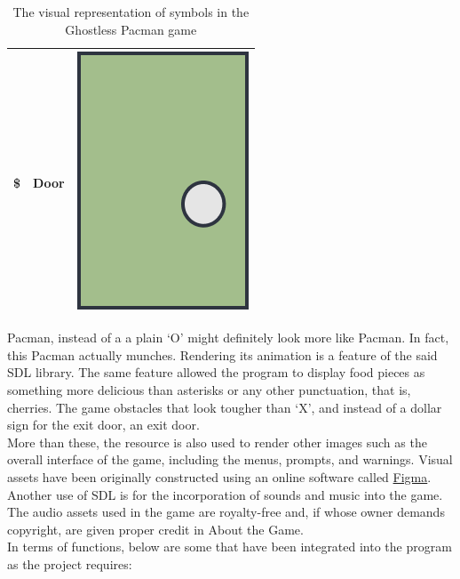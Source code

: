 \begin{table}[H]
\begin{tabular}{ c c c }
        \$ & Door & \includegraphics[scale=0.1]{assets/door_sample.png}\\
        \bottomrule
    \end{tabular}
    \caption{The visual representation of symbols in the Ghostless Pacman game}
    \label{tab:1}
\end{table}

Pacman, instead of a a plain `O' might definitely look more like Pacman. In
fact, this Pacman actually munches. Rendering its animation is a feature of the
said SDL library. The same feature allowed the program to display food pieces
as something more delicious than asterisks or any other punctuation, that is,
cherries. The game obstacles that look tougher than `X', and instead of a
dollar sign for the exit door, an exit door.\\

More than these, the resource is also used to render other images such as the
overall interface of the game, including the menus, prompts, and warnings.
Visual assets have been originally constructed using an online software called
\href{https://www.figma.com/}{Figma}.\\

Another use of SDL is for the incorporation of sounds and music into the game.
The audio assets used in the game are royalty-free and, if whose owner demands
copyright, are given proper credit in About the Game.\\

In terms of functions, below are some that have been integrated into the
program as the project requires:

